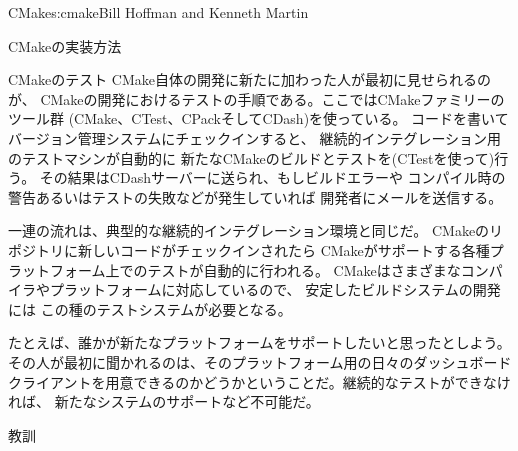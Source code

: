 \begin{aosachapter}{CMake}{s:cmake}{Bill Hoffman and Kenneth Martin}
\begin{aosasect1}{CMakeの実装方法}
\begin{aosasect2}{CMakeのテスト}
CMake自体の開発に新たに加わった人が最初に見せられるのが、
CMakeの開発におけるテストの手順である。ここではCMakeファミリーのツール群
(CMake、CTest、CPackそしてCDash)を使っている。
コードを書いてバージョン管理システムにチェックインすると、
継続的インテグレーション用のテストマシンが自動的に
新たなCMakeのビルドとテストを(CTestを使って)行う。
その結果はCDashサーバーに送られ、もしビルドエラーや
コンパイル時の警告あるいはテストの失敗などが発生していれば
開発者にメールを送信する。

一連の流れは、典型的な継続的インテグレーション環境と同じだ。
CMakeのリポジトリに新しいコードがチェックインされたら
CMakeがサポートする各種プラットフォーム上でのテストが自動的に行われる。
CMakeはさまざまなコンパイラやプラットフォームに対応しているので、
安定したビルドシステムの開発には
この種のテストシステムが必要となる。

たとえば、誰かが新たなプラットフォームをサポートしたいと思ったとしよう。
その人が最初に聞かれるのは、そのプラットフォーム用の日々のダッシュボード
クライアントを用意できるのかどうかということだ。継続的なテストができなければ、
新たなシステムのサポートなど不可能だ。

\end{aosasect2}

\end{aosasect1}

\begin{aosasect1}{教訓}


\end{aosasect1}
\end{aosachapter}
